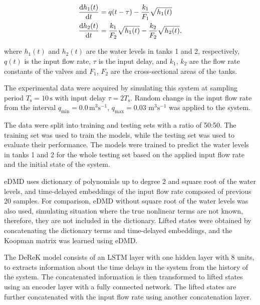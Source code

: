 \documentclass[conference]{IEEEtran}
\newcommand{\ui}[2]{#1_{\text{#2}}}
\begin{document}
\begin{equation}\label{eq:two_tanks_system}
    \begin{aligned}
        \diff{h_1(t)}{t} & = q(t-\tau) - \frac{k_1}{F_1}\sqrt{h_1(t)}                     \\
        \diff{h_2(t)}{t} & = \frac{k_1}{F_2}\sqrt{h_1(t)} - \frac{k_2}{F_2}\sqrt{h_2(t)},
    \end{aligned}
\end{equation}

where \(h_1(t)\) and \(h_2(t)\) are the water levels in tanks 1 and 2, respectively, \(q(t)\) is the input flow rate, \(\tau \) is the input delay, and \(k_1\), \(k_2\) are the flow rate constants of the valves and \(F_1\), \(F_2\) are the cross-sectional areas of the tanks.

The experimental data were acquired by simulating this system at sampling period \( \ui{T}{s} = 10 \, \mathrm{s} \) with input delay \( \tau = 2\ui{T}{s} \). Random change in the input flow rate from the interval \( \ui{q}{min} = 0.0 \, \text{m}^3\text{s}^{-1} \), \( \ui{q}{max} = 0.03 \) \( \text{m}^3\text{s}^{-1} \) was applied to the system.

The data were split into training and testing sets with a ratio of 50:50. The training set was used to train the models, while the testing set was used to evaluate their performance. The models were trained to predict the water levels in tanks 1 and 2 for the whole testing set based on the applied input flow rate and the initial state of the system.

eDMD uses dictionary of polynomials up to degree 2 and square root of the water levels, and time-delayed embeddings of the input flow rate composed of previous 20 samples. For comparison, eDMD without square root of the water levels was also used, simulating situation where the true nonlinear terms are not known, therefore, they are not included in the dictionary. Lifted states were obtained by concatenating the dictionary terms and time-delayed embeddings, and the Koopman matrix was learned using eDMD.

The DeReK model consists of an LSTM layer with one hidden layer with 8 units, to extracts information about the time delays in the system from the history of the system. The concatenated information is then transformed to lifted states using an encoder layer with a fully connected network. The lifted states are further concatenated with the input flow rate using another concatenation layer.
\end{document}
